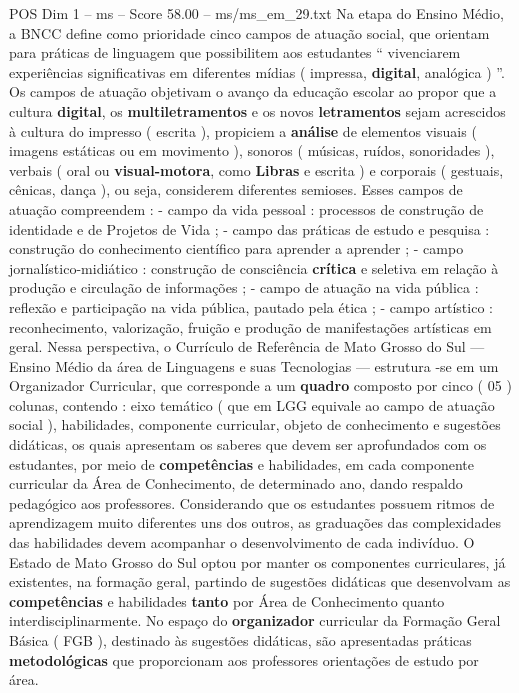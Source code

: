 \begin{textsample}{POS Dim 1 – ms – Score 58.00 – ms/ms\_em\_29.txt}
Na etapa do Ensino Médio, a BNCC define como prioridade cinco campos de atuação social, que orientam para práticas de linguagem que possibilitem aos estudantes “ vivenciarem experiências significativas em diferentes mídias ( impressa, \textbf{digital}, analógica ) ”.
Os campos de atuação objetivam o avanço da educação escolar ao propor que a cultura \textbf{digital}, os \textbf{multiletramentos} e os novos \textbf{letramentos} sejam acrescidos à cultura do impresso ( escrita ), propiciem a \textbf{análise} de elementos visuais ( imagens estáticas ou em movimento ), sonoros ( músicas, ruídos, sonoridades ), verbais ( oral ou \textbf{visual-motora}, como \textbf{Libras} e escrita ) e corporais ( gestuais, cênicas, dança ), ou seja, considerem diferentes semioses.
Esses campos de atuação compreendem : - campo da vida pessoal : processos de construção de identidade e de Projetos de Vida ; - campo das práticas de estudo e pesquisa : construção do conhecimento científico para aprender a aprender ; - campo jornalístico-midiático : construção de consciência \textbf{crítica} e seletiva em relação à produção e circulação de informações ; - campo de atuação na vida pública : reflexão e participação na vida pública, pautado pela ética ; - campo artístico : reconhecimento, valorização, fruição e produção de manifestações artísticas em geral.
Nessa perspectiva, o Currículo de Referência de Mato Grosso do Sul — Ensino Médio da área de Linguagens e suas Tecnologias — estrutura -se em um Organizador Curricular, que corresponde a um \textbf{quadro} composto por cinco ( 05 ) colunas, contendo : eixo temático ( que em LGG equivale ao campo de atuação social ), habilidades, componente curricular, objeto de conhecimento e sugestões didáticas, os quais apresentam os saberes que devem ser aprofundados com os estudantes, por meio de \textbf{competências} e habilidades, em cada componente curricular da Área de Conhecimento, de determinado ano, dando respaldo pedagógico aos professores.
Considerando que os estudantes possuem ritmos de aprendizagem muito diferentes uns dos outros, as graduações das complexidades das habilidades devem acompanhar o desenvolvimento de cada indivíduo.
O Estado de Mato Grosso do Sul optou por manter os componentes curriculares, já existentes, na formação geral, partindo de sugestões didáticas que desenvolvam as \textbf{competências} e habilidades \textbf{tanto} por Área de Conhecimento quanto interdisciplinarmente.
No espaço do \textbf{organizador} curricular da Formação Geral Básica ( FGB ), destinado às sugestões didáticas, são apresentadas práticas \textbf{metodológicas} que proporcionam aos professores orientações de estudo por área.

\end{textsample}
